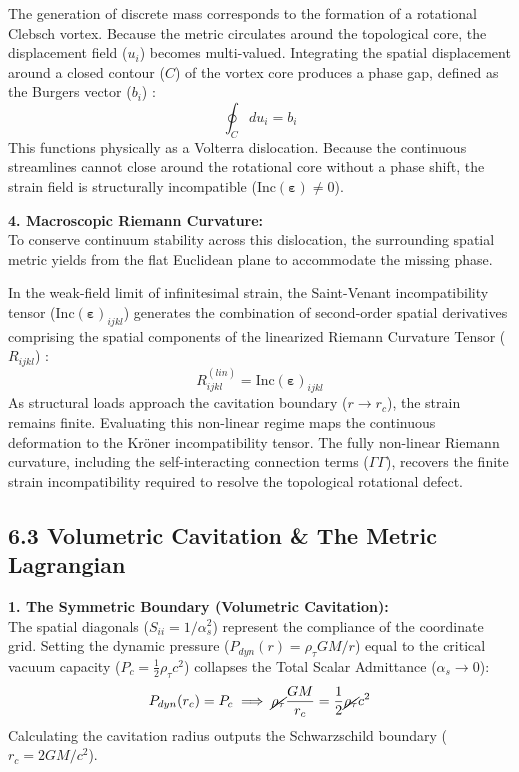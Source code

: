 The generation of discrete mass corresponds to the formation of a rotational Clebsch vortex. Because the metric circulates around the topological core, the displacement field ($u_i$) becomes multi-valued. Integrating the spatial displacement around a closed contour ($C$) of the vortex core produces a phase gap, defined as the Burgers vector ($b_i$) \cite{Nye1953}: 
\begin{equation}
    \oint_C d u_i = b_i 
\end{equation}
This functions physically as a Volterra dislocation. Because the continuous streamlines cannot close around the rotational core without a phase shift, the strain field is structurally incompatible ($\text{Inc}(\boldsymbol{\varepsilon}) \neq 0$).

\textbf{4. Macroscopic Riemann Curvature:} \\
To conserve continuum stability across this dislocation, the surrounding spatial metric yields from the flat Euclidean plane to accommodate the missing phase. 

In the weak-field limit of infinitesimal strain, the Saint-Venant incompatibility tensor ($\text{Inc}(\boldsymbol{\varepsilon})_{ijkl}$) generates the combination of second-order spatial derivatives comprising the spatial components of the linearized Riemann Curvature Tensor ($R_{ijkl}$) \cite{Kroner1958}:  
\begin{equation} 
    R_{ijkl}^{(lin)} = \text{Inc}(\boldsymbol{\varepsilon})_{ijkl} 
\end{equation}
As structural loads approach the cavitation boundary ($r \to r_c$), the strain remains finite. Evaluating this non-linear regime maps the continuous deformation to the Kröner incompatibility tensor. The fully non-linear Riemann curvature, including the self-interacting connection terms ($\Gamma \Gamma$), recovers the finite strain incompatibility required to resolve the topological rotational defect.

\subsection*{6.3 Volumetric Cavitation \& The Metric Lagrangian}

\textbf{1. The Symmetric Boundary (Volumetric Cavitation):} \\
The spatial diagonals ($S_{ii} = 1/\alpha_s^2$) represent the compliance of the coordinate grid. Setting the dynamic pressure ($P_{dyn}(r) = \rho_\tau GM/r$) equal to the critical vacuum capacity ($P_c = \frac{1}{2}\rho_\tau c^2$) collapses the Total Scalar Admittance ($\alpha_s \to 0$): 
\begin{equation}
    P_{dyn}(r_c) = P_c \implies \cancel{\rho_\tau} \frac{GM}{r_c} = \frac{1}{2}\cancel{\rho_\tau} c^2 
\end{equation}
Calculating the cavitation radius outputs the Schwarzschild boundary ($r_c = 2GM/c^2$). 

